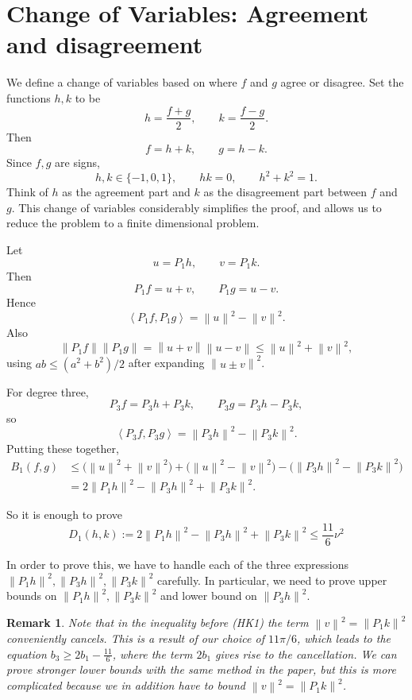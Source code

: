 \documentclass[11pt]{article}
\newtheorem{remark}[theorem]{Remark}
\newcommand{\ip}[2]{\left\langle #1,#2\right\rangle}
\newcommand{\norm}[1]{\left\|#1\right\|}
\begin{document}
\section{Change of Variables: Agreement and disagreement}

We define a change of variables based on where $f$ and $g$ agree or disagree. Set the functions $h, k$ to be
\[
        h=\frac{f+g}{2},\qquad k=\frac{f-g}{2}.
\]
Then
\[
        f=h+k,
        \qquad
        g=h-k.
\]
Since $f,g$ are signs,
\[
        h,k\in\{-1,0,1\},
        \qquad
        hk=0,
        \qquad
        h^2+k^2=1.
\]
Think of $h$ as the agreement part and $k$ as the disagreement part between $f$ and $g$. This change of variables considerably simplifies the proof, and allows us to reduce the problem to a finite dimensional problem. 

Let
\[
        u=P_1h,\qquad v=P_1k.
\]
Then
\[
        P_1f=u+v,
        \qquad
        P_1g=u-v.
\]
Hence
\[
        \ip{P_1f}{P_1g}=\norm{u}^2-\norm{v}^2.
\]
Also
\[
        \norm{P_1f}\norm{P_1g}
        =\norm{u+v}\norm{u-v}
        \le \norm{u}^2+\norm{v}^2,
\]
using $ab\le(a^2+b^2)/2$ after expanding $\norm{u\pm v}^2$.

For degree three,
\[
        P_3f=P_3h+P_3k,
        \qquad
        P_3g=P_3h-P_3k,
\]
so
\[
        \ip{P_3f}{P_3g}=\norm{P_3h}^2-\norm{P_3k}^2.
\]
Putting these together,
\begin{align*}
        B_1(f,g)
        &\le
        \bigl(\norm{u}^2+\norm{v}^2\bigr)
        +\bigl(\norm{u}^2-\norm{v}^2\bigr)
        -\bigl(\norm{P_3h}^2-\norm{P_3k}^2\bigr)\\
        &=2\norm{P_1h}^2-\norm{P_3h}^2+\norm{P_3k}^2.
\end{align*}

So it is enough to prove
\begin{equation}
\boxed{\displaystyle
        D_1(h,k):=2\norm{P_1h}^2-\norm{P_3h}^2+\norm{P_3k}^2
        \le \frac{11}{6}\nu^2
}
\tag{HK1}
\end{equation}

In order to prove this, we have to handle each of the three expressions $\norm{P_1h}^2, \norm{P_3h}^2, \norm{P_3k}^2$ carefully. In particular, we need to prove upper bounds on  $\norm{P_1h}^2, \norm{P_3k}^2$ and lower bound on $\norm{P_3h}^2$. 

\begin{remark}
    Note that in the inequality before (HK1) the term $\norm{v}^2 = \norm{P_1k}^2$ conveniently cancels. This is a result of our choice of $11\pi/6$, which leads to the equation $b_3 \geq 2b_1 - \frac{11}{6}$, where the term $2b_1$ gives rise to the cancellation. We can prove stronger lower bounds with the same method in the paper, but this is more complicated because we in addition have to bound $\norm{v}^2 = \norm{P_1k}^2$.
\end{remark}
\end{document}
